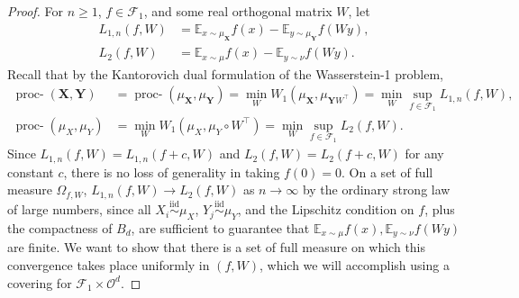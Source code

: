 \documentclass[12pt]{article}
\newcommand{\EE}{\mathbb{E}}
\theoremstyle{definition}
\newcommand{\bX}{\mathbf{X}}
\newcommand{\bY}{\mathbf{Y}}
\newcommand{\procwp}[1][2]{\mathop{\mbox{proc-$W_#1$}}}
\newcommand{\procwphat}[1][2]{\mathop{\mbox{proc-$\hat{W}_#1$}}}
\begin{document}
\begin{proof}
For $n\geq 1$, $f\in \mathcal{F}_1$, and some real orthogonal matrix $W$, let
\begin{align*}
L_{1,n}(f,W)&= \EE_{x\sim \mu_\bX} f(x) - \EE_{y\sim \mu_\bY} f(Wy),\\
L_2(f,W) &= \EE_{x\sim \mu} f(x) - \EE_{y\sim \nu} f(Wy).
\end{align*}
Recall that by the Kantorovich dual formulation of the Wasserstein-1 problem, 
\begin{align*}
\procwphat[1](\bX,\bY)&=\procwp[1](\mu_{\bX},\mu_{\bY})=\min_W W_1(\mu_\bX,\mu_{\bY W^\top})= \min_W \sup_{f\in\mathcal{F}_1} L_{1,n}(f,W),\\
\procwp[1](\mu_X,\mu_Y)&=\min_W W_1(\mu_X,\mu_{Y}\circ W^\top)=\min_W\sup_{f\in\mathcal{F}_1}L_2(f,W).
\end{align*}
Since $L_{1,n}(f,W)=L_{1,n}(f+c,W)$ and $L_2(f,W)=L_2(f+c,W)$ for any constant $c$, there is no loss of generality in taking $f(0)=0$. On a set of full measure $\Omega_{f,W}$, $L_{1,n}(f,W)\rightarrow L_2(f,W)$ as $n\rightarrow\infty$ by the ordinary strong law of large numbers, since all $X_i\overset{\text{iid}}{\sim} \mu_X$, $Y_j\overset{\text{iid}}{\sim} \mu_Y$, and the Lipschitz condition on $f$, plus the compactness of $B_d$, are sufficient to guarantee that $\EE_{x\sim \mu} f(x), \EE_{y\sim \nu} f(Wy)$ are finite. We want to show that there is a set of full measure on which this convergence takes place uniformly in $(f,W)$, which we will accomplish using a covering for $\mathcal{F}_1\times \mathcal{O}^{d}$. 


\end{proof}
\end{document}
